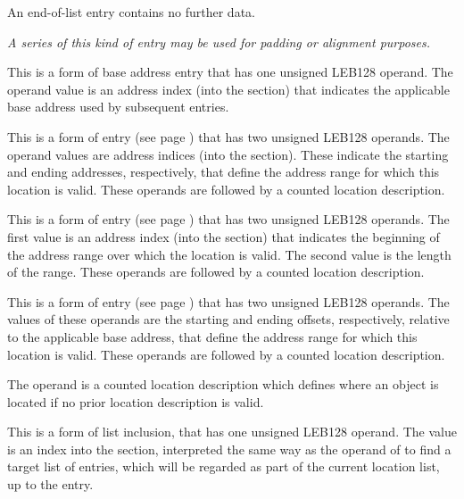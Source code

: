 \begin{enumerate}[1. ]
\itembfnl{\DWLLEendoflistTARG}
An end-of-list entry contains no further data.

\textit{A series of this kind of entry may be used for padding or
alignment purposes.}


\itembfnl{\DWLLEbaseaddressxTARG}
This is a form of base address entry that has one unsigned
LEB128 operand. The operand value is an address index (into the
\dotdebugaddr{} section) that indicates the applicable base address
used by subsequent \DWLLEoffsetpair{} entries.

\itembfnl{\DWLLEstartxendxTARG}
This is a form of  entry
\bb
(see page \pageref{text:bndlocdesc})
\eb
that has two unsigned LEB128 operands. The operand values are
address indices (into the \dotdebugaddr{} section). These indicate the
starting and ending addresses, respectively, that define
the address range for which this location is valid.
These operands are followed by a counted location description.

\itembfnl{\DWLLEstartxlengthTARG}
This is a form of  entry
\bb
(see page \pageref{text:bndlocdesc})
\eb
that has two unsigned LEB128 operands. The first value is an address index
(into the \dotdebugaddr{} section)
that indicates the beginning of the address range over
which the location is valid.
The second value is the length of the range.
These operands are followed by a counted location description.

\itembfnl{\DWLLEoffsetpairTARG}
This is a form of  entry
\bb
(see page \pageref{text:bndlocdesc})
\eb
that has two unsigned LEB128 operands. The values of these
operands are the starting and ending offsets, respectively,
relative to the applicable base address, that define the
address range for which this location is valid.
These operands are followed by a counted location description.

\itembfnl{\DWLLEdefaultlocationTARG}
The operand is a counted location description which defines
where an object is located if no prior location description
is valid.

\bb
\itembfnl{\DWLLEincludeloclistxTARG}
This is a form of list inclusion, that has one unsigned LEB128
operand.  The value is an index into the \dotdebugloclists{} section,
interpreted the same way as the operand of \DWFORMloclistx{} to find
a target list of entries, which will be regarded as part of the
current location list, up to the \DWLLEendoflist{} entry.
\eb

\end{enumerate}

